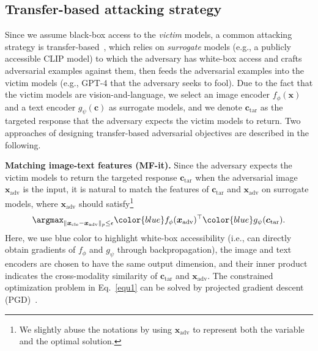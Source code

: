 \subsection{Transfer-based attacking strategy}
Since we assume black-box access to the \emph{victim} models, a common attacking strategy is transfer-based~\citep{Dong2017,dong2019evading,liu2016delving,Papernot20162,xie2019improving,yang2022boosting}, which relies on \emph{surrogate} models (e.g., a publicly accessible CLIP model) to which the adversary has white-box access and crafts adversarial examples against them, then feeds the adversarial examples into the victim models (e.g., GPT-4 that the adversary seeks to fool). Due to the fact that the victim models are vision-and-language, we select an image encoder $f_{\phi}(\boldsymbol{x})$ and a text encoder $g_{\psi}(\boldsymbol{c})$ as surrogate models, and we denote $\boldsymbol{c}_{\text{tar}}$ as the targeted response that the adversary expects the victim models to return. Two approaches of designing transfer-based adversarial objectives are described in the following.

\textbf{Matching image-text features (MF-it).}
Since the adversary expects the victim models to return the targeted response $\boldsymbol{c}_{\text{tar}}$ when the adversarial image $\boldsymbol{x}_{\text{adv}}$ is the input, it is natural to match the features of $\boldsymbol{c}_{\text{tar}}$ and $\boldsymbol{x}_{\text{adv}}$ on surrogate models, where $\boldsymbol{x}_{\text{adv}}$ should satisfy\footnote{We slightly abuse the notations by using $\boldsymbol{x}_{\text{adv}}$ to represent both the variable and the optimal solution.}
\begin{equation}
    \argmax_{\|\boldsymbol{x}_{\text{cle}}-\boldsymbol{x}_{\text{adv}}\|_{p}\leq \epsilon} {\color{blue}f_{\phi}}(\boldsymbol{x}_{\text{adv}})^{\top}{\color{blue}g_{\psi}}(\boldsymbol{c}_{\text{tar}})\textrm{.}
    \label{equ1}
\end{equation}
Here, we use {\color{blue}blue} color to highlight white-box accessibility (i.e., can directly obtain gradients of $f_{\phi}$ and $g_{\psi}$ through backpropagation), the image and text encoders are chosen to have the same output dimension, and their inner product indicates the cross-modality similarity of $\boldsymbol{c}_{\text{tar}}$ and $\boldsymbol{x}_{\text{adv}}$. The constrained optimization problem in Eq.~\eqref{equ1} can be solved by projected gradient descent (PGD)~\citep{madry2018towards}.

